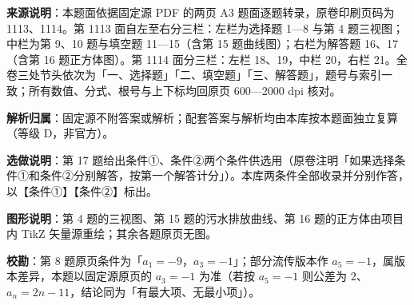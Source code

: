 

\begin{gknotice}
\textbf{来源说明}：本题面依据固定源 PDF 的两页 A3 题面逐题转录，原卷印刷页码为 1113、1114。第 1113 面自左至右分三栏：左栏为选择题 1—8 与第 4 题三视图；中栏为第 9、10 题与填空题 11—15（含第 15 题曲线图）；右栏为解答题 16、17（含第 16 题正方体图）。第 1114 面分三栏：左栏 18、19，中栏 20，右栏 21。全卷三处节头依次为「一、选择题」「二、填空题」「三、解答题」，题号与索引一致；所有数值、分式、根号与上下标均回原页 600—2000 dpi 核对。

\textbf{解析归属}：固定源不附答案或解析；配套答案与解析均由本库按本题面独立复算（等级 D，非官方）。

\textbf{选做说明}：第 17 题给出条件①、条件②两个条件供选用（原卷注明「如果选择条件①和条件②分别解答，按第一个解答计分」）。本库两条件全部收录并分别作答，以【条件①】【条件②】标出。

\textbf{图形说明}：第 4 题的三视图、第 15 题的污水排放曲线、第 16 题的正方体由项目内 TikZ 矢量源重绘；其余各题原页无图。

\textbf{校勘}：第 8 题原页条件为「$a_1=-9$，$a_3=-1$」；部分流传版本作 $a_5=-1$，属版本差异，本题以固定源原页的 $a_3=-1$ 为准（若按 $a_5=-1$ 则公差为 $2$、$a_n=2n-11$，结论同为「有最大项、无最小项」）。
\end{gknotice}


